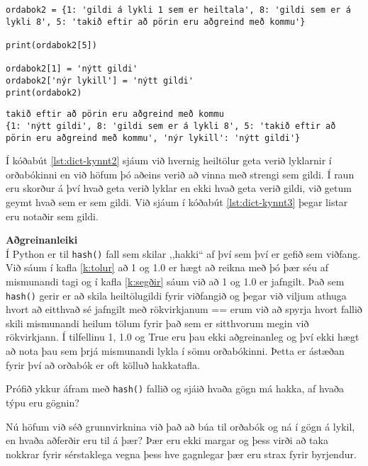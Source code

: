 \begin{lstlisting}[caption=Gögnum bætt við og þau tekin út, label=lst:dict-kynnt2]
ordabok2 = {1: 'gildi á lykli 1 sem er heiltala', 8: 'gildi sem er á lykli 8', 5: 'takið eftir að pörin eru aðgreind með kommu'}

print(ordabok2[5])

ordabok2[1] = 'nýtt gildi' 
ordabok2['nýr lykill'] = 'nýtt gildi'
print(ordabok2)
\end{lstlisting}
\lstset{style=uttak}
\begin{lstlisting}
takið eftir að pörin eru aðgreind með kommu
{1: 'nýtt gildi', 8: 'gildi sem er á lykli 8', 5: 'takið eftir að pörin eru aðgreind með kommu', 'nýr lykill': 'nýtt gildi'}
\end{lstlisting}
\lstset{style=venjulegt}

Í kóðabút \ref{lst:dict-kynnt2} sjáum við hvernig heiltölur geta verið lyklarnir í orðabókinni en við höfum þó aðeins verið að vinna með strengi sem gildi.
Í raun eru skorður á því hvað geta verið lyklar en ekki hvað geta verið gildi, við getum geymt hvað sem er sem gildi.
Við sjáum í kóðabút \ref{lst:dict-kynnt3} þegar listar eru notaðir sem gildi.

\begin{itarefni}
\textbf{Aðgreinanleiki}\\
Í Python er til \texttt{hash()} fall sem skilar ,,hakki“ af því sem því er gefið sem viðfang.
Við sáum í kafla \ref{k:tolur} að 1 og 1.0 er hægt að reikna með þó þær séu af mismunandi tagi og í kafla \ref{k:segðir} sáum við að 1 og 1.0 er jafngilt.
Það sem \texttt{hash()} gerir er að skila heiltölugildi fyrir viðfangið og þegar við viljum athuga hvort að eitthvað sé jafngilt með rökvirkjanum == erum við að spyrja hvort fallið skili mismunandi heilum tölum fyrir það sem er sitthvorum megin við rökvirkjann.
Í tilfellinu 1, 1.0 og True eru þau ekki aðgreinanleg og því ekki hægt að nota þau sem þrjá mismunandi lykla í sömu orðabókinni.
Þetta er ástæðan fyrir því að orðabók er oft kölluð hakkatafla.

Prófið ykkur áfram með \texttt{hash()} fallið og sjáið hvaða gögn má hakka, af hvaða týpu eru gögnin?
\end{itarefni}

Nú höfum við séð grunnvirknina við það að búa til orðabók og ná í gögn á lykil, en hvaða aðferðir eru til á þær?
Þær eru ekki margar og þess virði að taka nokkrar fyrir sérstaklega vegna þess hve gagnlegar þær eru strax fyrir byrjendur.


